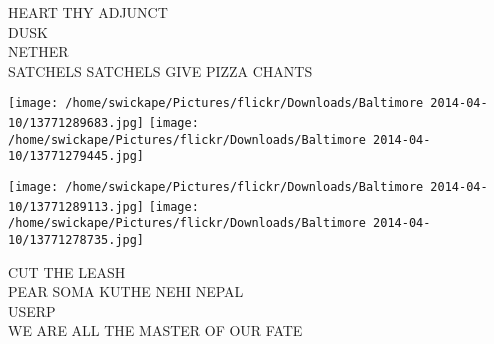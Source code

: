 \documentclass[10pt,letterpaper]{article}
\begin{document}
HEART THY ADJUNCT\\
DUSK\\
NETHER\\
SATCHELS SATCHELS GIVE PIZZA CHANTS\\
\pagebreak

\texttt{[image: /home/swickape/Pictures/flickr/Downloads/Baltimore 2014-04-10/13771289683.jpg]}
\texttt{[image: /home/swickape/Pictures/flickr/Downloads/Baltimore 2014-04-10/13771279445.jpg]}

\texttt{[image: /home/swickape/Pictures/flickr/Downloads/Baltimore 2014-04-10/13771289113.jpg]}
\texttt{[image: /home/swickape/Pictures/flickr/Downloads/Baltimore 2014-04-10/13771278735.jpg]}

CUT THE LEASH\\
PEAR SOMA KUTHE NEHI NEPAL\\
USERP\\
WE ARE ALL THE MASTER OF OUR FATE\\
\pagebreak
\end{document}

